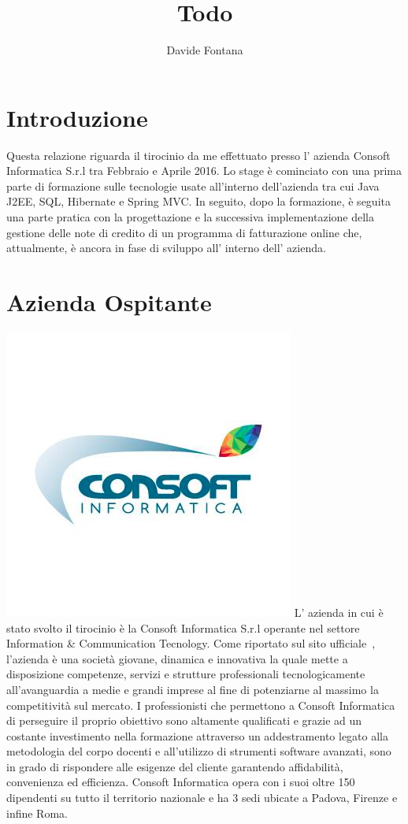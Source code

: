 \documentclass[12pt,a4paper,twoside,openright]{toptesi}
\title{Todo}
\author{Davide Fontana}
\begin{document}
\maketitle
\tableofcontents
\chapter{Introduzione}
Questa relazione riguarda il tirocinio da me effettuato presso l' azienda 
Consoft Informatica S.r.l tra Febbraio e Aprile 2016.
Lo stage è cominciato con una prima parte di formazione sulle tecnologie usate 
all'interno dell'azienda tra cui Java J2EE, SQL, Hibernate e Spring MVC\@.
In seguito, dopo la formazione, è seguita una parte pratica con la progettazione
e la successiva implementazione della gestione delle note di credito di un 
programma di fatturazione online che, attualmente, è ancora in fase di sviluppo
all' interno dell' azienda.
\chapter{Azienda Ospitante}
\includegraphics[scale=.5]{img/logoConsoft}
L' azienda in cui è stato svolto il tirocinio è la Consoft Informatica S.r.l
operante nel settore Information \& Communication
Tecnology\@.
Come riportato sul sito ufficiale~\cite{consoft:descrizione}, l'azienda è una
società giovane, dinamica e innovativa la quale mette a disposizione competenze,
servizi e strutture professionali tecnologicamente all’avanguardia a medie e 
grandi imprese al fine di potenziarne al massimo la competitività sul mercato. 
I professionisti che permettono a Consoft Informatica di perseguire il 
proprio obiettivo sono altamente qualificati e grazie ad un costante 
investimento nella formazione attraverso un  addestramento legato alla 
metodologia del corpo docenti e all’utilizzo di strumenti software avanzati, 
sono in grado di rispondere alle esigenze del cliente garantendo affidabilità,
convenienza ed efficienza.
Consoft Informatica opera con i suoi oltre 150 dipendenti su tutto il territorio
nazionale e ha 3 sedi ubicate a Padova, Firenze e infine Roma.
\end{document}
